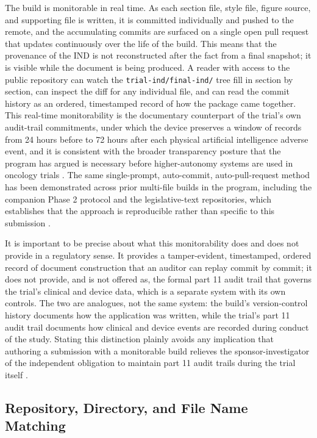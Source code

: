 The build is monitorable in real time. As each section file, style file, figure
source, and supporting file is written, it is committed individually and pushed to
the remote, and the accumulating commits are surfaced on a single open pull request
that updates continuously over the life of the build. This means that the
provenance of the IND is not reconstructed after the fact from a final snapshot;
it is visible while the document is being produced. A reader with access to the
public repository can watch the \texttt{trial-ind/final-ind/} tree fill in section
by section, can inspect the diff for any individual file, and can read the commit
history as an ordered, timestamped record of how the package came together. This
real-time monitorability is the documentary counterpart of the trial's own
audit-trail commitments, under which the device preserves a window of records from
24 hours before to 72 hours after each physical artificial intelligence adverse
event, and it is consistent with the broader transparency posture that the program
has argued is necessary before higher-autonomy systems are used in oncology trials
\cite{congress9510, clintrustpai, natlpaiplatf}. The same single-prompt,
auto-commit, auto-pull-request method has been demonstrated across prior multi-file
builds in the program, including the companion Phase 2 protocol and the
legislative-text repositories, which establishes that the approach is reproducible
rather than specific to this submission \cite{oncotrialllm, paipredict4x}.

It is important to be precise about what this monitorability does and does not
provide in a regulatory sense. It provides a tamper-evident, timestamped,
ordered record of document construction that an auditor can replay commit by
commit; it does not provide, and is not offered as, the formal part 11 audit trail
that governs the trial's clinical and device data, which is a separate system with
its own controls. The two are analogues, not the same system: the build's
version-control history documents how the application was written, while the
trial's part 11 audit trail documents how clinical and device events are recorded
during conduct of the study. Stating this distinction plainly avoids any
implication that authoring a submission with a monitorable build relieves the
sponsor-investigator of the independent obligation to maintain part 11 audit trails
during the trial itself \cite{paiautospons, paisitedocpk}.

\subsection{Repository, Directory, and File Name Matching}

